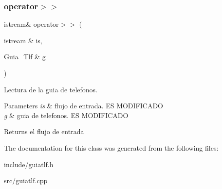 \subsubsection{\texorpdfstring{operator$>$$>$}{operator>>}}
{\footnotesize\ttfamily istream\& operator$>$$>$ (\begin{DoxyParamCaption}\item[{istream \&}]{is,  }\item[{\mbox{\hyperlink{classGuia__Tlf}{Guia\+\_\+\+Tlf}} \&}]{g }\end{DoxyParamCaption})\hspace{0.3cm}{\ttfamily [friend]}}



Lectura de la guia de telefonos. 


\begin{DoxyParams}{Parameters}
{\em is} & flujo de entrada. ES M\+O\+D\+I\+F\+I\+C\+A\+DO \\
\hline
{\em g} & guia de telefonos. ES M\+O\+D\+I\+F\+I\+C\+A\+DO \\
\hline
\end{DoxyParams}
\begin{DoxyReturn}{Returns}
el flujo de entrada 
\end{DoxyReturn}


The documentation for this class was generated from the following files\+:\begin{DoxyCompactItemize}
\item 
include/guiatlf.\+h\item 
src/guiatlf.\+cpp\end{DoxyCompactItemize}

